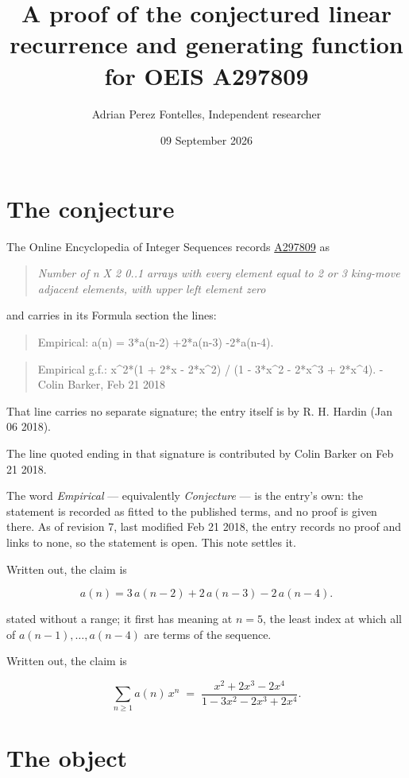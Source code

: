 \documentclass[11pt]{article}
\title{A proof of the conjectured linear recurrence and generating function for OEIS A297809}
\author{Adrian Perez Fontelles, Independent researcher}
\date{09 September 2026}
\theoremstyle{definition}
\begin{document}
\maketitle
\section{The conjecture}

The Online Encyclopedia of Integer Sequences records \href{https://oeis.org/A297809}{A297809} as

\begin{quote}\itshape Number of n X 2 0..1 arrays with every element equal to 2 or 3 king-move adjacent elements, with upper left element zero\end{quote}

and carries in its Formula section the lines:

\begin{quote}\ttfamily Empirical: a(n) = 3*a(n-2) +2*a(n-3) -2*a(n-4).\end{quote}

\begin{quote}\ttfamily Empirical g.f.: x\textasciicircum{}2*(1 + 2*x - 2*x\textasciicircum{}2) / (1 - 3*x\textasciicircum{}2 - 2*x\textasciicircum{}3 + 2*x\textasciicircum{}4). - Colin Barker, Feb 21 2018\end{quote}

That line carries no separate signature; the entry itself is by R. H. Hardin (Jan 06 2018).

The line quoted ending in that signature is contributed by Colin Barker on Feb 21 2018.

The word {\itshape Empirical} --- equivalently {\itshape Conjecture} --- is the entry's own: the statement is recorded as fitted to the published terms, and no proof is given there. As of revision 7, last modified Feb 21 2018, the entry records no proof and links to none, so the statement is open. This note settles it.

Written out, the claim is

\[a(n) = 3\,a(n-2) + 2\,a(n-3) - 2\,a(n-4).\]

stated without a range; it first has meaning at $n = 5$, the least index at which all of $a(n-1),\dots,a(n-4)$ are terms of the sequence.

Written out, the claim is

\[\sum_{n \ge 1} a(n)\,x^n \;=\; \frac{x^{2} + 2x^{3} - 2x^{4}}{1 - 3x^{2} - 2x^{3} + 2x^{4}}.\]

\section{The object}
\end{document}
